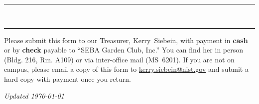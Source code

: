 \documentclass[letterpaper,12pt,dvipsnames,notitlepage]{article}
\newcommand{\mailto}[1]{\href{mailto:#1}{#1}}
\begin{document}
\begin{Form}
\begin{center}
  \hrule{}
  \vskip2pt
\\[4pt]
\hrule{}
\end{center}

\noindent
Please submit this form to our Treasurer, Kerry~Siebein, with payment in
\textbf{cash} or by \textbf{check} payable to ``SEBA Garden Club, Inc.''  You
can find her in person (Bldg. 216, Rm. A109) or via inter-office mail (MS~6201).
If you are not on campus, please email a copy of this form to
\mailto{kerry.siebein@nist.gov} and submit a hard copy with payment once you
return.

\vfill

\noindent
\footnotesize{\emph{Updated \today{}}}\hfill\footnotesize {}
\end{Form}

\newpage
\resizebox{7in}{10in}{}
\end{document}
